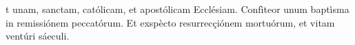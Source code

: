 t unam, sanctam, católicam, et apostólicam Ecclésiam. Confìteor unum baptìsma in remissiónem peccatórum. Et exspècto resurrecçiónem mortuórum, et vitam ventúri sáeculi.
